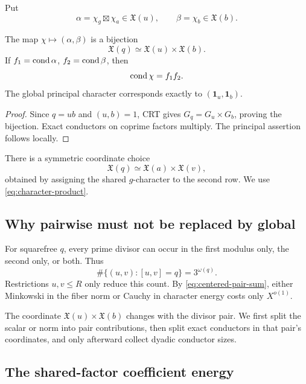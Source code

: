 Put
\[
 \alpha=\chi_g\boxtimes\chi_a\in\mathfrak X(u),
 \qquad \beta=\chi_b\in\mathfrak X(b).
\]

\begin{corollary}
\label{cor:product-conductors}
The map \(\chi\mapsto(\alpha,\beta)\) is a bijection
\begin{equation}
 \mathfrak X(q)\simeq\mathfrak X(u)\times\mathfrak X(b).
 \label{eq:character-product}
\end{equation}
If \(f_1=\operatorname{cond}\alpha\), \(f_2=\operatorname{cond}\beta\), then
\begin{equation}
 \operatorname{cond}\chi=f_1f_2.
 \label{eq:conductor-product}
\end{equation}
The global principal character corresponds exactly to
\((\mathbf1_u,\mathbf1_b)\).
\end{corollary}

\begin{proof}
Since \(q=ub\) and \((u,b)=1\), CRT gives
\(G_q=G_u\times G_b\), proving the bijection.  Exact conductors on
coprime factors multiply.  The principal assertion follows locally.
\end{proof}

There is a symmetric coordinate choice
\[
 \mathfrak X(q)\simeq\mathfrak X(a)\times\mathfrak X(v),
\]
obtained by assigning the shared \(g\)-character to the second row.
We use \eqref{eq:character-product}.

\subsection{Why pairwise must not be replaced by global}

For squarefree \(q\), every prime divisor can occur in the first modulus
only, the second only, or both.  Thus
\begin{equation}
 \#\{(u,v):[u,v]=q\}=3^{\omega(q)}.
 \label{eq:lcm-pair-count}
\end{equation}
Restrictions \(u,v\le R\) only reduce this count.  By
\eqref{eq:centered-pair-sum}, either Minkowski in the fiber norm or
Cauchy in character energy costs only \(X^{o(1)}\).

The coordinate \(\mathfrak X(u)\times\mathfrak X(b)\) changes with the
divisor pair.  We first split the scalar or norm into pair contributions,
then split exact conductors in that pair's coordinates, and only
afterward collect dyadic conductor sizes.

\subsection{The shared-factor coefficient energy}

